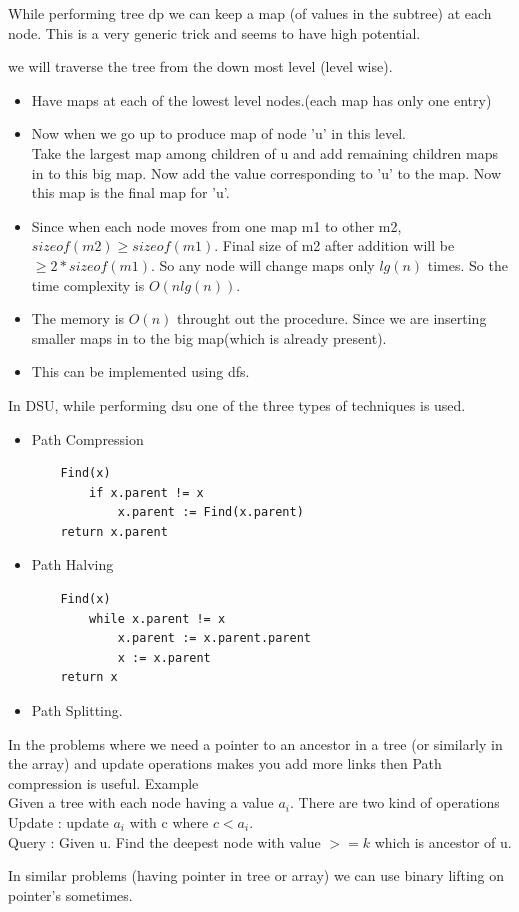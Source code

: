 \documentclass[../Notes.tex]{subfiles}
\begin{document}
While performing tree dp we can keep a map (of values in the subtree) at each node. This is a very generic trick and seems to have high potential.

we will traverse the tree from the down most level (level wise).

\begin{itemize}
	\item Have maps at each of the lowest level nodes.(each map has only one entry)
	\item Now when we go up to produce map of node 'u' in this level.\\
	Take the largest map among children of u and add remaining children maps in to this big map. Now add the value corresponding to 'u' to the map. Now this map is the final map for 'u'.
	\item Since when each node moves from one map m1 to other m2, $sizeof(m2) \geq sizeof(m1)$. Final size of m2 after addition will be $\geq 2*sizeof(m1)$. So any node will change maps only $lg(n)$ times. So the time complexity is $O(nlg(n))$.
	\item The memory is $O(n)$ throught out the procedure. Since we are inserting smaller maps in to the big map(which is already present).
	\item This can be implemented using dfs.
\end{itemize}

In DSU, while performing dsu one of the three types of techniques is used.
\begin{itemize}
	\item Path Compression \\
	\begin{lstlisting}
	Find(x)
    	if x.parent != x
     		x.parent := Find(x.parent)
	return x.parent
   	\end{lstlisting}
   	
   	\item Path Halving \\
   	\begin{lstlisting}
   	Find(x)
   		while x.parent != x
     		x.parent := x.parent.parent
     		x := x.parent
   	return x
   \end{lstlisting}
   
   \item Path Splitting.
\end{itemize}
In the problems where we need a pointer to an ancestor in a tree (or similarly in the array) and update operations makes you add more links then Path compression is useful. Example \\

Given a tree with each node having a value $a_{i}$. There are two kind of operations\\
Update : update $a_{i}$ with c where $c<a_{i}$.\\
Query : Given u. Find the deepest node with value $>= k$ which is ancestor of u.

In similar problems (having pointer in tree or array) we can use binary lifting on pointer's sometimes.
\end{document}
